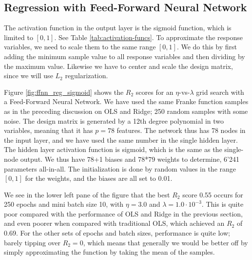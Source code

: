 \documentclass[]{article}
\begin{document}
\subsection{Regression with Feed-Forward Neural Network}



The activation function in the output layer is the sigmoid function, which is limited to $[0,1]$. See Table \ref{tab:activation-funcs}. To approximate the response variables, we need to scale them to the same range $[0,1]$. We do this by first adding the minimum sample value to all response variables and then dividing by the maximum value. Likewise we have to center and scale the design matrix, since we will use $L_2$ regularization.

Figure \ref{fig:ffnn_reg_sigmoid} shows the $R_2$ scores for an $\eta$-vs-$\lambda$ grid search with a Feed-Forward Neural Network. We have used the same Franke function samples as in the preceding discussion on OLS and Ridge; 250 random samples with some noise. The design matrix is generated by a 12th degree polynomial in two variables, meaning that it has $p = 78$ features. The network thus has 78 nodes in the input layer, and we have used the same number in the single hidden layer. The hidden layer activation function is sigmoid, which is the same as the single-node output. We thus have 78+1 biases and 78*79 weights to determine, 6'241 parameters all-in-all. The initialization is done by random values in the range $[0,1]$ for the weights, and the biases are all set to 0.01.

We see in the lower left pane of the figure that the best $R_2$ score 0.55 occurs for 250 epochs and mini batch size 10, with $\eta = 3.0$ and $\lambda = 1.0 \cdot 10^{-3}$. This is quite poor compared with the performance of OLS and Ridge in the previous section, and even poorer when compared with traditional OLS, which achieved an $R_2$ of 0.69. For the other sets of epochs and batch sizes, performance is quite low; barely tipping over $R_2 = 0$, which means that generally we would be better off by simply approximating the function by taking the mean of the samples.
\end{document}
